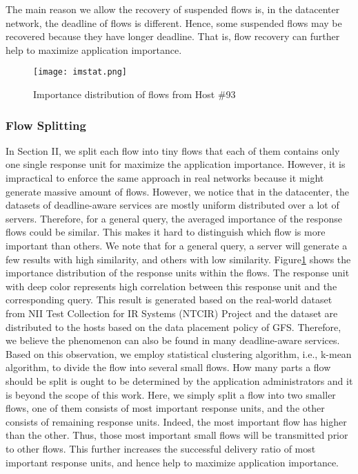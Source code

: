 \documentclass[conference]{IEEEtran}
\begin{document}
The main reason we allow the recovery of suspended flows is, in the datacenter network, the deadline of flows is different. Hence, some suspended flows may be recovered because they have longer deadline. That is, flow recovery can further help to maximize application importance.



\begin{figure}
  \centering
\texttt{[image: imstat.png]}\\
  \caption{Importance distribution of flows from Host \#93}\label{fig:imstat}
\end{figure}

\subsubsection{Flow Splitting}

In Section II, we split each flow into tiny flows that each of them contains only one single response unit for maximize the application importance. However, it is impractical to enforce the same approach in real networks because it might generate massive amount of flows. However, we notice that in the datacenter, the datasets of deadline-aware services are mostly uniform distributed over a lot of servers. Therefore, for a general query, the averaged importance of the response flows could be similar. This makes it hard to distinguish which flow is more important than others. We note that for a general query, a server will generate a few results with high similarity, and others with low similarity. Figure\ref{fig:imstat} shows the importance distribution of the response units within the flows. The response unit with deep color represents high correlation between this response unit and the corresponding query. This result is generated based on the real-world dataset from NII Test Collection for IR Systems (NTCIR) Project\cite{ntcir} and the dataset are distributed to the hosts based on the data placement policy of GFS\cite{gfs}. Therefore, we believe the phenomenon can also be found in many deadline-aware services. Based on this observation, we employ statistical clustering algorithm, i.e., k-mean algorithm, to divide the flow into several small flows. How many parts a flow should be split is ought to be determined by the application administrators and it is beyond the scope of this work. Here, we simply split a flow into two smaller flows, one of them consists of most important response units, and the other consists of remaining response units. Indeed, the most important flow has higher  than the other. Thus, those most important small flows will be transmitted prior to other flows. This further increases the successful delivery ratio of most important response units, and hence help to maximize application importance.
\end{document}
